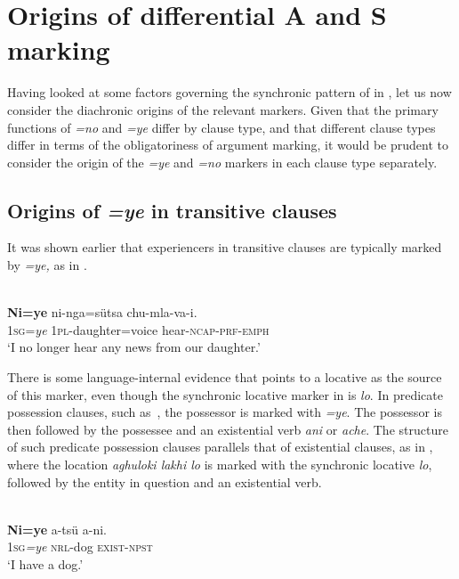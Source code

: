 \documentclass[output=paper]{LSP/langsci}
\begin{document}
\section{Origins of differential A and S marking}\label{13-te-sec:4}

Having looked at some factors governing the synchronic pattern of  in , let us now consider the diachronic origins of the relevant markers. 
Given that the primary functions of \textit{=no} and \textit{=ye} differ by clause type, and that different clause types differ in terms of the obligatoriness of argument marking, it would be prudent to consider the origin of the \textit{=ye} and \textit{=no} markers in each clause type separately.


\subsection{Origins of \textit{=ye} in transitive clauses}\label{13-te-sec:4.1}

It was shown earlier that experiencers in transitive clauses are typically marked by \textit{=ye,} as in .

\ea\label{13-te-ex:29}
\\
\gll \textbf{Ni=ye} ni-nga=sütsa chu-mla-va-i.\\
1\textsc{sg}=\textit{ye} 1\textsc{pl}-daughter=voice hear-\textsc{ncap}-\textsc{prf}-\textsc{emph}\\
\glt ‘I no longer hear any news from our daughter.’ %
\z

There is some language-internal evidence that points to a locative as the source of this marker, even though the synchronic locative marker in  is \textit{lo}. In predicate possession clauses, such as~, the possessor is marked with \textit{=ye}. The possessor is then followed by the possessee and an existential verb \textit{ani} or \textit{ache}. The structure of such predicate possession clauses parallels that of existential clauses, as in , where the location \textit{aghuloki lakhi lo} is marked with the synchronic locative \textit{lo}, followed by the entity in question and an existential verb. 

\ea\label{13-te-ex:30}
\\
\gll \textbf{Ni=ye} a-tsü a-ni.\\
1\textsc{sg}\textit{=ye} \textsc{nrl}-dog \textsc{exist}-\textsc{npst}\\
\glt ‘I have a dog.’
\z
\end{document}
